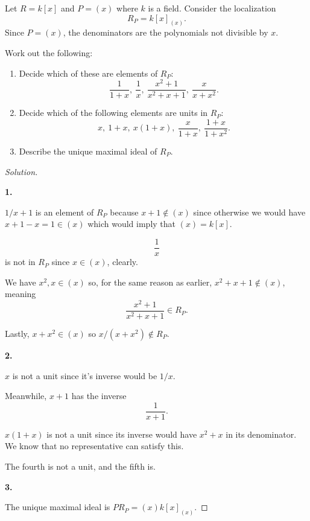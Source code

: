 \documentclass[11pt]{article}
\begin{document}
\begin{prob}
    Let $R = k[x]$ and $P = (x)$ where 
    $k$ is a field. Consider the localization 
    \[
        R_P = k[x]_{(x)}. 
    \]
    Since $P=(x)$, the denominators 
    are the polynomials not divisible by $x$. 

    Work out the following: 
    \begin{enumerate}
        \item Decide which of these are elements of $R_P$: 
            \[
                \frac{1}{1+x}, \ 
                \frac{1}{x}, \ 
                \frac{x^2 + 1}{x^2 + x + 1}, \ 
                \frac{x}{x+x^2}.   
            \]
        \item Decide which of the following elements 
            are units in $R_P$: 
            \[
                x, \ 1+x, \ x(1+x), \ \frac{x}{1+x}, \ 
                \frac{1+x}{1+x^2}. 
            \]
        \item Describe the unique maximal ideal of 
            $R_P$. 
    \end{enumerate}
\end{prob}
\begin{proof}[Solution]
    \medskip 
    \

    \textbf{1.}

    $1/x+1$ is an element of $R_P$ because 
    $x+1 \not\in (x)$ since otherwise we 
    would have $x+1 - x = 1 \in (x)$ which would 
    imply that $(x) = k[x]$. 
    
    \[
        \frac{1}{x}
    \]
    is not in $R_P$ since $x \in (x)$, clearly. 

    We have $x^2, x \in (x)$ so, for the 
    same reason as earlier, $x^2 + x + 1 \not\in (x)$, meaning 
    \[
        \frac{x^2 + 1}{x^2 + x + 1} \in R_P. 
    \]

    Lastly, $x+x^2 \in (x)$ so $x/(x+x^2) \not\in R_P$. 

    \textbf{2.}

    $x$ is not a unit since it's inverse would be 
    $1/x$. 

    Meanwhile, $x+1$ has the inverse 
    \[
        \frac{1}{x+1}. 
    \]

    $x(1+x)$ is not a unit since its inverse 
    would have $x^2 + x$ in its denominator. 
    We know that no representative can satisfy this. 

    The fourth is not a unit, and the fifth is. 

    \textbf{3.}

    The unique maximal ideal is 
    $PR_P = (x)k[x]_{(x)}$. 
\end{proof} 
\end{document}
